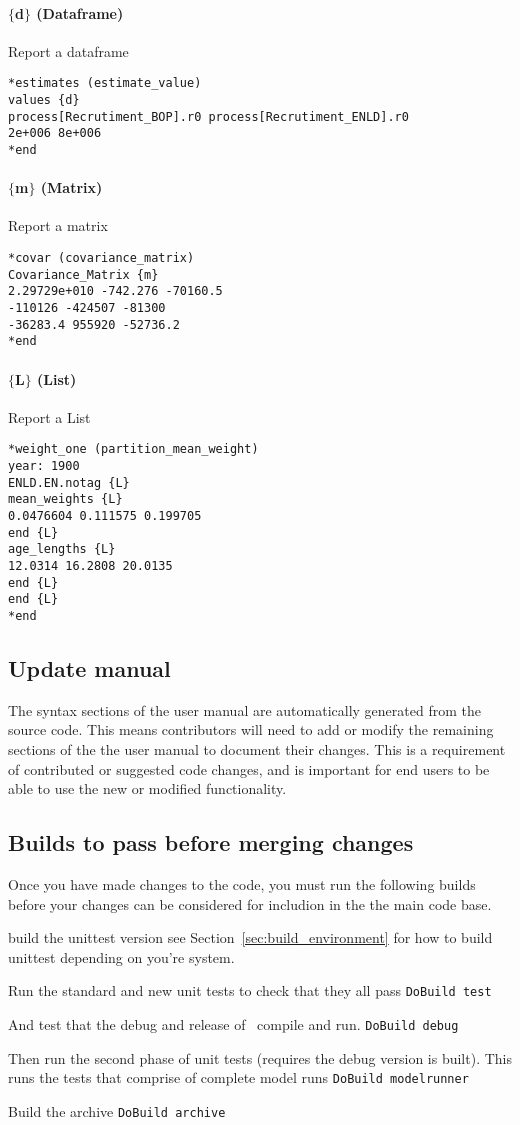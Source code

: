 \paragraph*{$\{$d$\}$ (Dataframe)}
Report a dataframe
{\small{\begin{verbatim}
*estimates (estimate_value)
values {d}
process[Recrutiment_BOP].r0 process[Recrutiment_ENLD].r0 
2e+006 8e+006
*end
\end{verbatim}}}

\paragraph*{$\{$m$\}$ (Matrix)}
Report a matrix
{\small{\begin{verbatim}
*covar (covariance_matrix)
Covariance_Matrix {m}
2.29729e+010 -742.276 -70160.5
-110126 -424507 -81300 
-36283.4 955920 -52736.2 
*end
\end{verbatim}}}

\paragraph*{$\{$L$\}$ (List)}
Report a List
{\small{\begin{verbatim}
*weight_one (partition_mean_weight)
year: 1900
ENLD.EN.notag {L}
mean_weights {L}
0.0476604 0.111575 0.199705
end {L}
age_lengths {L}
12.0314 16.2808 20.0135
end {L}
end {L}
*end
\end{verbatim}}}

\subsection{Update manual}
The syntax sections of the user manual are automatically generated from the source code. This means contributors will need to add or modify the remaining sections of the the user manual to document their changes. This is a requirement of contributed or suggested code changes, and is important for end users to be able to use the new or modified functionality.

\subsection{Builds to pass before merging changes}

Once you have made changes to the code, you must run the following builds before your changes can be considered for includion in the the main code base.

build the unittest version see Section~\ref{sec:build_environment} for how to build unittest depending on you're system.

Run the standard and new unit tests to check that they all pass
\texttt{DoBuild test}

And test that the debug and release of \CNAME\ compile and run.
\texttt{DoBuild debug}

Then run the second phase of unit tests (requires the debug version is built). This runs the tests that comprise of complete model runs
\texttt{DoBuild modelrunner}

Build the archive 
\texttt{DoBuild archive}


